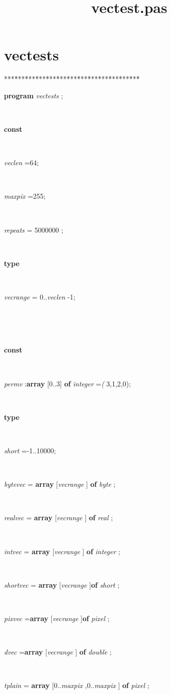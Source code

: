 \documentclass[10pt, a4paper]{article}
\title{vectest.pas}
\begin{document}
\maketitle

\tableofcontents
\section{vectests}
\begin{tabbing}
***\=***\=***\=***\=***\=***\=***\=***\=***\=***\=***\=***\=***\=\kill
\parbox{14cm}{\textsf{\textbf{program}  \textit{vectests} ;}}\\
\+\parbox{14cm}{\textsf{\textbf{const} }}\\
\parbox{14cm}{\textsf{\textit{veclen}  =64;}}\\
\parbox{14cm}{\textsf{\textit{maxpix} =255;}}\\
\parbox{14cm}{\textsf{\textit{repeats}  = 5000000  ;}}\\
\<\parbox{14cm}{\textsf{\textbf{type} }}\\
\parbox{14cm}{\textsf{\textit{vecrange}  = 0..\textit{veclen} -1;}}\\
\\
\\
\<\parbox{14cm}{\textsf{\textbf{const} }}\\
\parbox{14cm}{\textsf{\textit{permv} :\textbf{array} [0..3] \textbf{of}  \textit{integer} =\textit{(} 3,1,2,0);}}\\
\<\parbox{14cm}{\textsf{\textbf{type} }}\\
\parbox{14cm}{\textsf{\textit{short} =-1..10000;}}\\
\parbox{14cm}{\textsf{\textit{bytevec}  = \textbf{array} [\textit{vecrange} ] \textbf{of}  \textit{byte} ;}}\\
\parbox{14cm}{\textsf{\textit{realvec} = \textbf{array}  [\textit{vecrange} ] \textbf{of}  \textit{real} ;}}\\
\parbox{14cm}{\textsf{\textit{intvec}  = \textbf{array} [\textit{vecrange} ] \textbf{of}  \textit{integer} ;}}\\
\parbox{14cm}{\textsf{\textit{shortvec} = \textbf{array} [\textit{vecrange} ]\textbf{of}  \textit{short} ;}}\\
\parbox{14cm}{\textsf{\textit{pixvec} =\textbf{array} [\textit{vecrange} ]\textbf{of}  \textit{pixel} ;}}\\
\parbox{14cm}{\textsf{\textit{dvec}  =\textbf{array} [\textit{vecrange} ] \textbf{of}  \textit{double} ;}}\\
\parbox{14cm}{\textsf{\textit{tplain}  = \textbf{array} [0..\textit{maxpix}  ,0..\textit{maxpix} ] \textbf{of}  \textit{pixel} ;}}\\

\end{tabbing}
\end{document}
